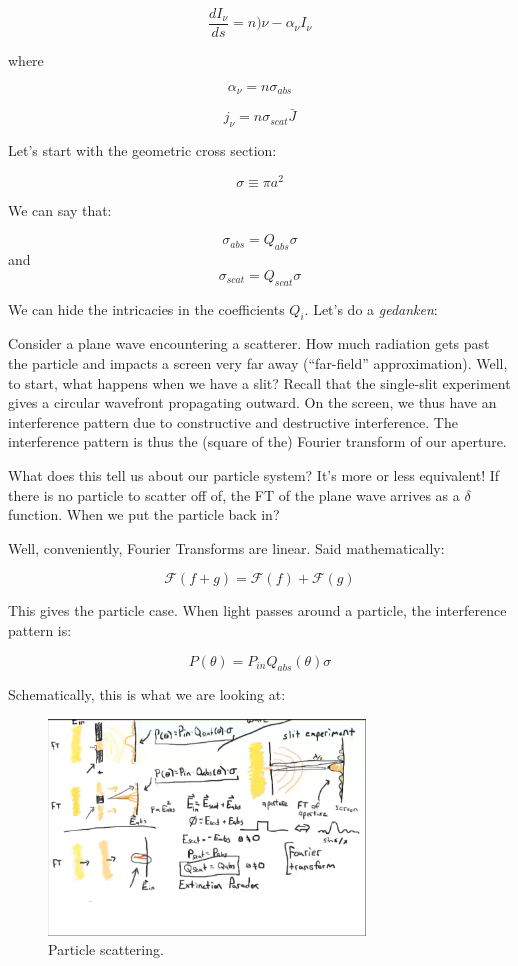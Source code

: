 \documentclass{article}
\begin{document}
$$
\frac{dI_\nu}{ds} = n)\nu - \alpha_\nu I_\nu
$$

where

$$
\alpha_\nu = n \sigma_{abs}
$$

$$
j_\nu = n \sigma_{scat} \bar{J}
$$

Let's start with the geometric cross section:

$$
\sigma \equiv \pi a^2 
$$

We can say that:

$$
\sigma_{abs} = Q_{abs} \sigma
$$
and
$$
\sigma_{scat} = Q_{scat} \sigma
$$

We can hide the intricacies in the coefficients $Q_i$. Let's do a \textit{gedanken}:

Consider a plane wave encountering a scatterer. How much radiation gets past the particle and impacts a screen very far away (``far-field'' approximation). Well, to start, what happens when we have a slit? Recall that the single-slit experiment gives a circular wavefront propagating outward. On the screen, we thus have an interference pattern due to constructive and destructive interference. The interference pattern is thus the (square of the) Fourier transform of our aperture. 

What does this tell us about our particle system? It's more or less equivalent! If there is no particle to scatter off of, the FT of the plane wave arrives as a $\delta$ function. When we put the particle back in? 

Well, conveniently, Fourier Transforms are linear. Said mathematically:

$$
\mathcal{F}\left(f+g\right) = \mathcal{F}\left(f\right) + \mathcal{F}\left(g\right)
$$

This gives the particle case. When light passes around a particle, the interference pattern is:

$$
P\left(\theta\right) = P_{in} Q_{abs}\left(\theta\right) \sigma
$$

Schematically, this is what we are looking at:

\begin{figure}
    \centering
    \includegraphics[width=0.75\textwidth]{figures/Screen Shot 2020-11-14 at 6.03.52 PM.png}
    \caption{Particle scattering. }
    \label{fig:sc}
\end{figure}
\end{document}
